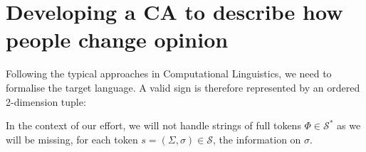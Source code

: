 
\section{Developing a CA to describe how people change opinion}
\label{sec:opinionca}

Following the typical approaches in Computational Linguistics, we need to formalise the target language.
A valid sign is therefore represented by an ordered 2-dimension tuple:

In the context of our effort, we will not handle strings of full tokens $\Phi \in \mathcal{S}^\ast$ as we will
be missing, for each token $s = (\Sigma, \sigma) \in \mathcal{S}$, the information on $\sigma$.
